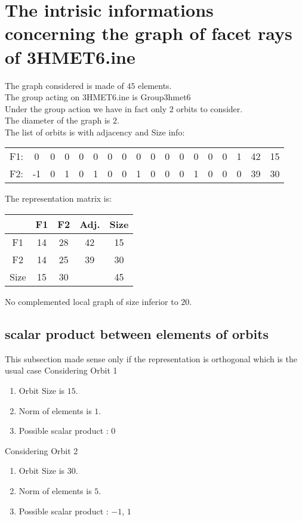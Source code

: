 \documentclass[12pt]{article}
\begin{document}
\section{The intrisic informations concerning the graph of facet rays of 3HMET6.ine}
The graph considered is made of $45$ elements.\\
The group acting on 3HMET6.ine is Group3hmet6\\
Under the group action we have in fact only $2$ orbits to consider.\\
The diameter of the graph is $2$.\\
The list of orbits is with adjacency and Size info:
\begin{center}
\scriptsize
\begin{tabular}{cccccccccccccccc|c|c}
F1:&0&0&0&0&0&0&0&0&0&0&0&0&0&0&1&42&15\\
F2:&-1&0&1&0&1&0&0&1&0&0&0&1&0&0&0&39&30\\
\end{tabular}
\end{center}
The representation matrix is:
\begin{center}
\scriptsize
\begin{tabular}{|c|cc|c|c|}
\hline
&F1&F2&Adj.&Size\\
\hline
F1& 14& 28&42&15\\
F2& 14& 25&39&30\\
\hline
Size&15&30&&45\\
\hline
\end{tabular}
\end{center}
No complemented local graph of size inferior to $20$.
\subsection{scalar product between elements of orbits}
\noindent This subsection made sense only if the representation is orthogonal which is the usual case
Considering Orbit 1
\begin{enumerate}
\item Orbit Size is $15$.
\item Norm of elements is $1$.
\item Possible scalar product : $0$
\end{enumerate}
Considering Orbit 2
\begin{enumerate}
\item Orbit Size is $30$.
\item Norm of elements is $5$.
\item Possible scalar product : $-1$, $1$
\end{enumerate}
\end{document}
